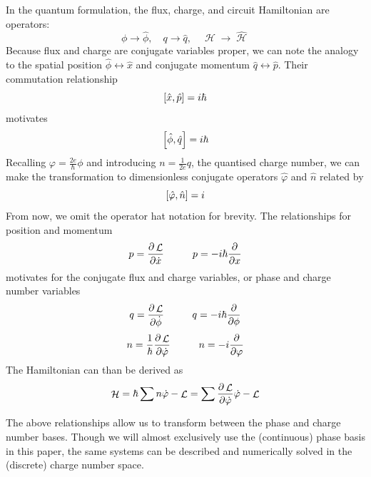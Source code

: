 \documentclass[11pt]{article}
\DeclareMathOperator{\lagr}{\mathcal{L}}
\DeclareMathOperator{\ham}{\mathcal{H}}
\begin{document}
In the quantum formulation, the flux, charge, and circuit Hamiltonian are operators:
\begin{equation}
\phi \rightarrow \hat{\phi}, \quad
q \rightarrow \hat{q}, \quad
\ham \rightarrow \hat{\ham}
\end{equation}
Because flux and charge are conjugate variables proper, we can note the analogy to the spatial position $\hat{\phi} \longleftrightarrow \hat{x}$ and conjugate momentum $\hat{q} \longleftrightarrow \hat{p}$. Their commutation relationship 
\begin{equation}
\comm{\hat{x}}{\hat{p}} = i \hbar
\end{equation}
motivates
\begin{equation}
\comm{\hat{\phi}}{\hat{q}} = i \hbar
\end{equation}
Recalling $\varphi = \frac{2e}{\hbar} \phi$ and introducing $n = \frac{1}{2e} q$, the quantised charge number, we can make the transformation to dimensionless conjugate operators $\hat{\varphi}$ and $\hat{n}$ related by
\begin{equation}
\comm{\hat{\varphi}}{\hat{n}} = i
\end{equation}
From now, we omit the operator hat notation for brevity. The relationships for position and momentum
\begin{equation}
p = \pdv{\lagr}{\dot{x}}
\hspace{1cm}
p = - i \hbar \pdv{}{x}
\end{equation}
motivates for the conjugate flux and charge variables, or phase and charge number variables
\begin{equation}
q = \pdv{\lagr}{\dot{\phi}}
\hspace{1cm}
q = -i \hbar \pdv{}{\phi}
\end{equation}
\begin{equation}
n = \frac{1}{\hbar} \pdv{\lagr}{\dot{\varphi}}
\hspace{1cm}
n = -i\pdv{}{\varphi}
\end{equation}
The Hamiltonian can than be derived as 
\begin{equation}
\ham = \hbar \sum n \dot{\varphi} - \lagr 
= \sum \pdv{\lagr}{\dot{\varphi}} \dot{\varphi} - \lagr
\end{equation}

The above relationships allow us to transform between the phase and charge number bases. Though we will almost exclusively use the (continuous) phase basis in this paper, the same systems can be described and numerically solved in the (discrete) charge number space. 
\end{document}
